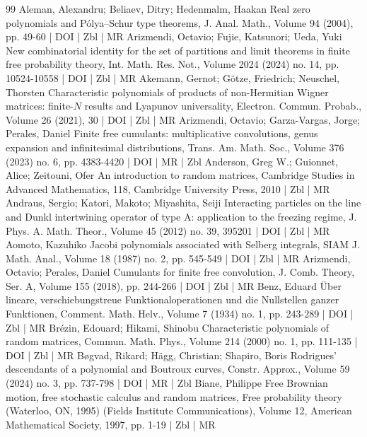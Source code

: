 \documentclass[10pt]{amsart}
\theoremstyle{definition}\newtheorem{defi}[theo]{Definition}\newtheorem{rema}[theo]{Remark}\newtheorem{exam}[theo]{Example}\newtheorem{exem}[theo]{Example}\newtheorem{nota}[theo]{Notation}
\begin{document}
\begin{thebibliography}{99}
Aleman, Alexandru; Beliaev, Ditry; Hedenmalm, Haakan Real zero polynomials and Pólya–Schur type theorems, J. Anal. Math., Volume 94 (2004), pp. 49-60 | DOI | Zbl | MR
Arizmendi, Octavio; Fujie, Katsunori; Ueda, Yuki New combinatorial identity for the set of partitions and limit theorems in finite free probability theory, Int. Math. Res. Not., Volume 2024 (2024) no. 14, pp. 10524-10558 | DOI | Zbl | MR
Akemann, Gernot; Götze, Friedrich; Neuschel, Thorsten Characteristic polynomials of products of non-Hermitian Wigner matrices: finite-${N}$ results and Lyapunov universality, Electron. Commun. Probab., Volume 26 (2021), 30 | DOI | Zbl | MR
Arizmendi, Octavio; Garza-Vargas, Jorge; Perales, Daniel Finite free cumulants: multiplicative convolutions, genus expansion and infinitesimal distributions, Trans. Am. Math. Soc., Volume 376 (2023) no. 6, pp. 4383-4420 | DOI | MR | Zbl
Anderson, Greg W.; Guionnet, Alice; Zeitouni, Ofer An introduction to random matrices, Cambridge Studies in Advanced Mathematics, 118, Cambridge University Press, 2010 | Zbl | MR
Andraus, Sergio; Katori, Makoto; Miyashita, Seiji Interacting particles on the line and Dunkl intertwining operator of type A: application to the freezing regime, J. Phys. A. Math. Theor., Volume 45 (2012) no. 39, 395201 | DOI | Zbl | MR
Aomoto, Kazuhiko Jacobi polynomials associated with Selberg integrals, SIAM J. Math. Anal., Volume 18 (1987) no. 2, pp. 545-549 | DOI | Zbl | MR
Arizmendi, Octavio; Perales, Daniel Cumulants for finite free convolution, J. Comb. Theory, Ser. A, Volume 155 (2018), pp. 244-266 | DOI | Zbl | MR
Benz, Eduard Über lineare, verschiebungstreue Funktionaloperationen und die Nullstellen ganzer Funktionen, Comment. Math. Helv., Volume 7 (1934) no. 1, pp. 243-289 | DOI | Zbl | MR
Brézin, Edouard; Hikami, Shinobu Characteristic polynomials of random matrices, Commun. Math. Phys., Volume 214 (2000) no. 1, pp. 111-135 | DOI | Zbl | MR
Bøgvad, Rikard; Hägg, Christian; Shapiro, Boris Rodrigues’ descendants of a polynomial and Boutroux curves, Constr. Approx., Volume 59 (2024) no. 3, pp. 737-798 | DOI | MR | Zbl
Biane, Philippe Free Brownian motion, free stochastic calculus and random matrices, Free probability theory (Waterloo, ON, 1995) (Fields Institute Communications), Volume 12, American Mathematical Society, 1997, pp. 1-19 | Zbl | MR

\end{thebibliography}
\end{document}
